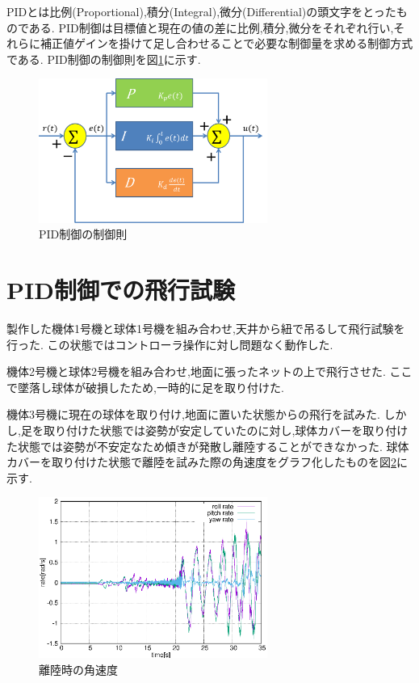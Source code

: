 \documentclass[12pt,oneside]{sotsuken_paper}
\begin{document}
PIDとは比例(Proportional),積分(Integral),微分(Differential)の頭文字をとったものである.
PID制御は目標値と現在の値の差に比例,積分,微分をそれぞれ行い,それらに補正値ゲインを掛けて足し合わせることで必要な制御量を求める制御方式である.\cite{pid}
PID制御の制御則を図\ref{fig:PID}に示す.

\begin{figure}[htbp]
	\begin{center}
		\includegraphics[width=75mm]{image/susiki/PID.png}
		\caption{PID制御の制御則}
		\label{fig:PID}
	\end{center}
\end{figure}

\section{PID制御での飛行試験}
製作した機体1号機と球体1号機を組み合わせ,天井から紐で吊るして飛行試験を行った.
この状態ではコントローラ操作に対し問題なく動作した.

機体2号機と球体2号機を組み合わせ,地面に張ったネットの上で飛行させた.
ここで墜落し球体が破損したため,一時的に足を取り付けた.

機体3号機に現在の球体を取り付け,地面に置いた状態からの飛行を試みた.
しかし,足を取り付けた状態では姿勢が安定していたのに対し,球体カバーを取り付けた状態では姿勢が不安定なため傾きが発散し離陸することができなかった.
球体カバーを取り付けた状態で離陸を試みた際の角速度をグラフ化したものを図\ref{fig:PID-flight}に示す.

\begin{figure}[htbp]
	\begin{center}
		\includegraphics[width=75mm]{image/flight-test/PID-flight.eps}
		\caption{離陸時の角速度}
		\label{fig:PID-flight}
	\end{center}
\end{figure}
\end{document}
